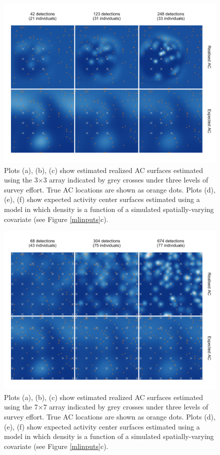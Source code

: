 \documentclass[useAMS,usenatbib,referee]{biom}
\begin{document}
\begin{figure}[htbp]
\centering
\includegraphics[width=1\textwidth]{mona_3x3.png}
\caption{Plots (a), (b), (c) show estimated realized AC surfaces estimated using the 3$\times$3 array indicated by grey crosses under three levels of survey effort. True AC locations are shown as orange dots. Plots (d), (e), (f) show expected activity center surfaces estimated using a model in which density is a function of a simulated spatially-varying covariate (see Figure \ref{mlinputs}c).}
\label{mona3x3}
\end{figure}


\begin{figure}[htbp]
\centering
\includegraphics[width=1\textwidth]{mona_7x7.png}
\caption{Plots (a), (b), (c) show estimated realized AC surfaces estimated using the 7$\times$7 array indicated by grey crosses under three levels of survey effort. True AC locations are shown as orange dots. Plots (d), (e), (f) show expected activity center surfaces estimated using a model in which density is a function of a simulated spatially-varying covariate (see Figure \ref{mlinputs}c).}
\label{mona7x7}
\end{figure}
\end{document}
